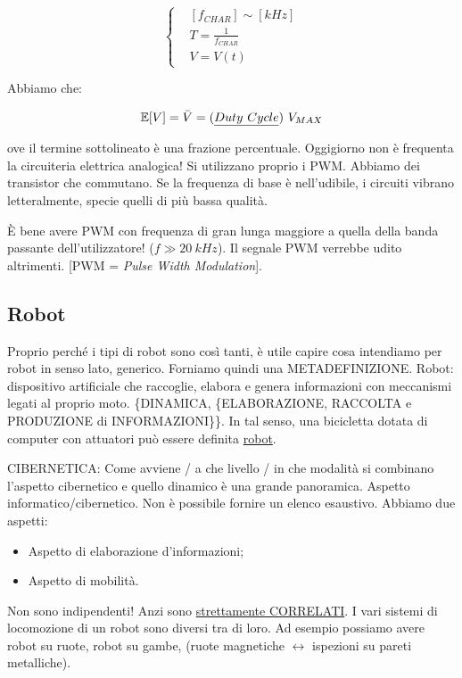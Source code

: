 \[
	\left\{
	\begin{aligned}
	& [f_{CHAR}] \sim [kHz]\\
	& T = \frac{1}{f_{CHAR}}\\
	& V = V(t)
	\end{aligned}
	\right.
\]

Abbiamo che:

\[	
	\E[V] = \bar{V} = (\underline{Duty\ Cycle})\ V_{MAX}
\]

ove il termine sottolineato è una frazione percentuale. Oggigiorno non è frequenta la circuiteria elettrica analogica! Si utilizzano proprio i PWM. Abbiamo dei transistor che commutano. Se la frequenza di base è nell'udibile, i circuiti vibrano letteralmente, specie quelli di più bassa qualità.

\`E bene avere PWM con frequenza di gran lunga maggiore a quella della banda passante dell'utilizzatore! ($f \gg 20\ kHz$). Il segnale PWM verrebbe udito altrimenti. [PWM = \emph{Pulse Width Modulation}].

\subsection{Robot}

Proprio perché i tipi di robot sono così tanti, è utile capire cosa intendiamo per robot in senso lato, generico. Forniamo quindi una METADEFINIZIONE. Robot: dispositivo artificiale che raccoglie, elabora e genera informazioni con meccanismi legati al proprio moto. \{DINAMICA, \{ELABORAZIONE, RACCOLTA e PRODUZIONE di INFORMAZIONI\}\}. In tal senso, una bicicletta dotata di computer con attuatori può essere definita \underline{robot}.

CIBERNETICA: Come avviene / a che livello / in che modalità si combinano l'aspetto cibernetico e quello dinamico è una grande panoramica. Aspetto informatico/cibernetico. Non è possibile fornire un elenco esaustivo. Abbiamo due aspetti:

\begin{itemize}
\item Aspetto di elaborazione d'informazioni;
\item Aspetto di mobilità.
\end{itemize}

Non sono indipendenti! Anzi sono \underline{strettamente CORRELATI}. I vari sistemi di locomozione di un robot sono diversi tra di loro. Ad esempio possiamo avere robot su ruote, robot su gambe, (ruote magnetiche $\leftrightarrow$ ispezioni su pareti metalliche).

